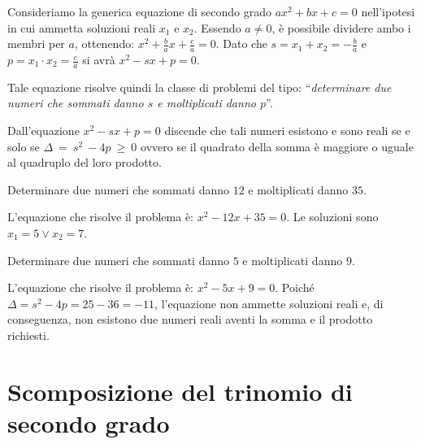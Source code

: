 Consideriamo la generica equazione di secondo grado $a x^{2} + bx + c = 0$ 
nell'ipotesi in cui ammetta soluzioni reali $x_{1}$ e $x_{2}$. Essendo $a \neq 
0$, è possibile dividere ambo i membri per $a$, ottenendo: $x^{2} + \frac{b}{a} 
x + \frac{c}{a} = 0$. Dato che $s = x_{1} + x_{2} = - \frac{b}{a}$ e $p = x_{1} 
\cdot x_{2} = \frac{c}{a}$ si avrà $x^{2} - s x + p = 0$.

Tale equazione risolve quindi la classe di problemi del tipo: 
``\emph{determinare due numeri che sommati danno $s$ e moltiplicati danno 
$p$}''.

Dall'equazione $x^{2} - s x + p = 0$ discende che tali numeri esistono e sono 
reali se e solo se $\Delta~=~s^{2}~-4p~\geq~0$ ovvero se il quadrato della 
somma 
è maggiore o uguale al quadruplo del loro prodotto.

\begin{esempio}
Determinare due numeri che sommati danno $12$ e moltiplicati danno $35$.

L'equazione che risolve il problema è: $x^{2} - 12 x + 35 = 0$. Le soluzioni 
sono $x_{1} = 5 \vee x_{2} = 7$.
\end{esempio}

\begin{esempio}
Determinare due numeri che sommati danno $5$ e moltiplicati danno $9$.

L'equazione che risolve il problema è: $x^{2} - 5 x + 9 = 0$. Poiché $\Delta = 
s^{2} - 4 p = 25 - 36 = - 11$, l'equazione non ammette soluzioni reali e, di 
conseguenza, non esistono due numeri reali aventi la somma e il prodotto 
richiesti.
\end{esempio}

\section{Scomposizione del trinomio di secondo grado}
\label{sec:eq2gr_scomposizione_trinomio}

